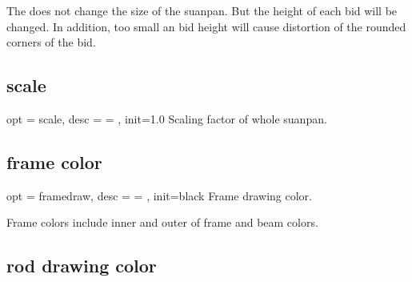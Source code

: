\documentclass[full]{l3doc}
\begin{document}
\begin{documentation}
  \begin{noteen}
    The  does not change the size of the suanpan.
    But the height of each bid will be changed.
    In addition, too small an bid height will cause distortion
    of the rounded corners of the bid.
  \end{noteen}

\subsection{scale}

\begin{option}{ opt = scale, desc = {= }, init=1.0 }
  Scaling factor of whole suanpan.
\end{option}

\begin{SideBySideExample}[frame=single,numbers=left,%
                xrightmargin=.40\linewidth,gobble=2]
  \centering
  \begin{suanpan}
  \end{suanpan}
\end{SideBySideExample}

\subsection{frame color}

\begin{option}{ opt = framedraw, desc = {= }, init=black }
  Frame drawing color.
\end{option}

\begin{SideBySideExample}[frame=single,numbers=left,%
                xrightmargin=.37\linewidth,gobble=2]
  \centering
  \begin{suanpan}
  \end{suanpan}
\end{SideBySideExample}

  \begin{noteen}
    Frame colors include inner and outer of frame and beam colors.
  \end{noteen}

\subsection{rod drawing color}


\end{documentation}
\end{document}
